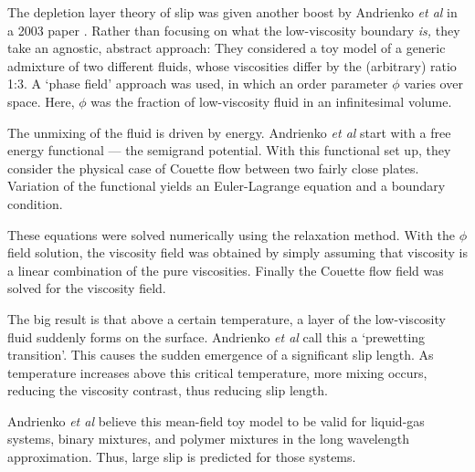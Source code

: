 \documentclass[12pt, a4paper, twoside, openright]{book}
\begin{document}
The depletion layer theory of slip was given another boost 
 by Andrienko \emph{et al} in a 2003 paper \cite{Andrienko2003}.  Rather than focusing on what the low-viscosity boundary \emph{is,} they take an agnostic, abstract approach: They considered a toy model of a generic admixture of two different fluids, whose viscosities differ by the (arbitrary) ratio 1:3.  A `phase field' approach was used, in which an order parameter $\phi$ varies over space.  Here, $\phi$ was the fraction of low-viscosity fluid in an infinitesimal volume.

The unmixing of the fluid is driven by energy.  Andrienko \emph{et al} start with a free energy functional --- the semigrand potential. With this functional set up, they consider the physical case of Couette flow between two fairly close plates. Variation of the functional yields an Euler-Lagrange equation and a boundary condition.


These equations were solved numerically using the relaxation method. With the $\phi$ field solution, the viscosity field was obtained by simply assuming that viscosity is a linear combination of the pure viscosities. Finally the Couette flow field was solved for the viscosity field.

The big result is that above a certain temperature, a layer of the low-viscosity fluid suddenly forms on the surface.  Andrienko \emph{et al} call this a `prewetting transition'.  This causes the sudden emergence of a significant slip length.  As temperature increases above this critical temperature, more mixing occurs, reducing the viscosity contrast, thus reducing slip length.

Andrienko \emph{et al} believe this mean-field toy model to be valid for liquid-gas systems, binary mixtures, and polymer mixtures in the long wavelength approximation.  Thus, large slip is predicted for those systems.
\end{document}
